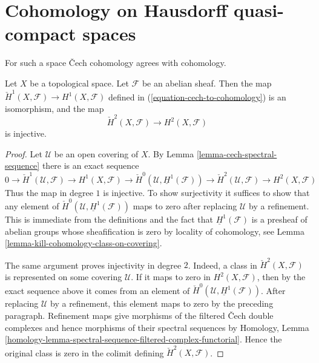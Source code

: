 \section{Cohomology on Hausdorff quasi-compact spaces}
\label{section-cohomology-LC}

\noindent
For such a space {\v C}ech cohomology agrees with cohomology.

\begin{lemma}
\label{lemma-cech-always}
\begin{reference}
\cite[Chapter III, Corollary 3.8.1(3), p. 176]{Tohoku}
\end{reference}
Let $X$ be a topological space. Let $\mathcal{F}$ be an abelian sheaf. Then
the map $\check{H}^1(X, \mathcal{F}) \to H^1(X, \mathcal{F})$ defined
in (\ref{equation-cech-to-cohomology}) is an isomorphism, and the map
$$
\check{H}^2(X, \mathcal{F}) \longrightarrow H^2(X, \mathcal{F})
$$
is injective.
\end{lemma}

\begin{proof}
Let $\mathcal{U}$ be an open covering of $X$.
By Lemma \ref{lemma-cech-spectral-sequence}
there is an exact sequence
$$
0 \to \check{H}^1(\mathcal{U}, \mathcal{F}) \to H^1(X, \mathcal{F})
\to \check{H}^0(\mathcal{U}, \underline{H}^1(\mathcal{F}))
\to \check{H}^2(\mathcal{U}, \mathcal{F}) \to H^2(X, \mathcal{F})
$$
Thus the map in degree $1$ is injective. To show surjectivity it suffices
to show that
any element of $\check{H}^0(\mathcal{U}, \underline{H}^1(\mathcal{F}))$
maps to zero after replacing $\mathcal{U}$ by a refinement.
This is immediate from the definitions and the fact that
$\underline{H}^1(\mathcal{F})$ is a presheaf of abelian groups
whose sheafification is zero by locality of cohomology, see
Lemma \ref{lemma-kill-cohomology-class-on-covering}.

The same argument proves injectivity in degree $2$. Indeed, a class in
$\check{H}^2(X, \mathcal{F})$ is represented on some covering
$\mathcal{U}$. If it maps to zero in $H^2(X, \mathcal{F})$, then by the
exact sequence above it comes from an element of
$\check{H}^0(\mathcal{U}, \underline{H}^1(\mathcal{F}))$. After replacing
$\mathcal{U}$ by a refinement, this element maps to zero by the preceding
paragraph. Refinement maps give morphisms of the filtered \v Cech double
complexes and hence morphisms of their spectral sequences by
Homology, Lemma
\ref{homology-lemma-spectral-sequence-filtered-complex-functorial}.
Hence the original class is zero in the colimit defining
$\check{H}^2(X, \mathcal{F})$.
\end{proof}

